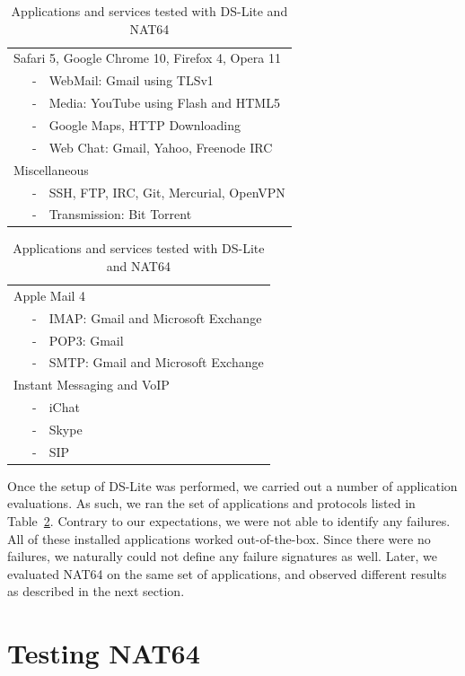 \documentclass{llncs}
\begin{document}
\begin{table}[ht!]
  \centering
  \caption{Applications and services tested with DS-Lite and NAT64}
  \begin{tabular}{|ll|}
    \hline
    \multicolumn{2}{|l|}{Safari 5, Google Chrome 10, Firefox 4, Opera 11} \\
    ~~~- & WebMail: Gmail using TLSv1 \\
    ~~~- & Media: YouTube using Flash and HTML5 \\
    ~~~- & Google Maps, HTTP Downloading \\
    ~~~- & Web Chat: Gmail, Yahoo, Freenode IRC \\
    \hline
    \multicolumn{2}{|l|}{Miscellaneous} \\
    ~~~- & SSH, FTP, IRC, Git, Mercurial, OpenVPN \\
    ~~~- & Transmission: Bit Torrent \\
    \hline
  \end{tabular}
  \hfill
  \begin{tabular}{|ll|}
    \hline
    \multicolumn{2}{|l|}{Apple Mail 4} \\
    ~~~- & IMAP: Gmail and Microsoft Exchange \\
    ~~~- & POP3: Gmail \\
    ~~~- & SMTP: Gmail and Microsoft Exchange \\
    \hline
    \multicolumn{2}{|l|}{Instant Messaging and VoIP} \\
    ~~~- & iChat \\
    ~~~- & Skype \\
    ~~~- & SIP \\
    \hline
  \end{tabular}
  \label{tab:tests}
\end{table}

Once the setup of DS-Lite was performed, we carried out a number of application evaluations. As such, we ran the set of applications and protocols listed in Table~\ref{tab:tests}. Contrary to our expectations, we were not able to identify any failures. All of these installed applications worked out-of-the-box. Since there were no failures, we naturally could not define any failure signatures as well. Later, we evaluated NAT64 on the same set of applications, and observed different results as described in the next section.

\section{Testing NAT64}
\label{sec:app-nat64}
\end{document}
